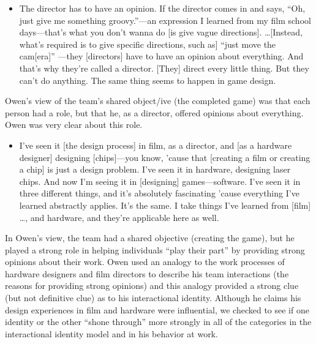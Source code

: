 \documentclass{chi2009}
\begin{document}
\begin{itemize}
\item[] The director has to have an opinion. If the director comes in and says, ``Oh, just give me something groovy.''---an expression I learned from my film school days---that's what you don't wanna do [is give vague directions]. \ldots [Instead, what's required is to give specific directions, such as] ``just move the cam[era]'' ---they [directors] have to have an opinion about everything. And that's why they're called a director. [They] direct every little thing. But they can't do anything. The same thing seems to happen in game design.
\end{itemize}

Owen's view of the team's shared object/ive (the completed game) was that each person had a role, but that he, as a director, offered opinions about everything.  Owen was very clear about this role.  

\begin{itemize} 
\item [] I've seen it [the design process] in film, as a director, and [as a hardware designer] designing [chips]---you know, 'cause that [creating a film or creating a chip] is just a design problem. I've seen it in hardware, designing laser chips. And now I'm seeing it in [designing] games---software. I've seen it in three different things, and it's absolutely fascinating 'cause everything I've learned abstractly applies. It's the same. I take things I've learned from [film] \ldots, and hardware, and they're applicable here as well.
\end{itemize}

In Owen's view, the team had a shared objective (creating the game), but he played a strong role in helping individuals ``play their part'' by providing strong opinions about their work. Owen used an analogy to the work processes of hardware designers and film directors to describe his team interactions (the reasons for providing strong opinions) and this analogy provided a strong clue (but not definitive clue) as to his interactional identity. Although he claims his design experiences in film and hardware were influential, we checked to see if one identity or the other ``shone through'' more strongly in all of the categories in the interactional identity model and in his behavior at work.  

\end{document}
